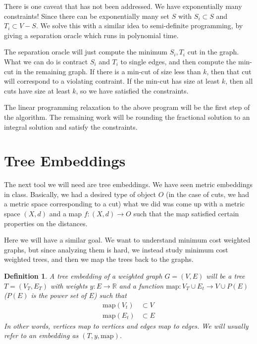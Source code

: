 \documentclass[12pt]{article}
\newtheorem{definition}{Definition}
\begin{document}
There is one caveat that has not been addressed. We have exponentially many constraints! Since there can be exponentially many set $S$ with $S_i \subset S$ and $T_i \subset V - S$. We solve this with a similar idea to semi-definite programming, by giving a separation oracle which runs in polynomial time. 

The separation oracle will just compute the minimum $S_i, T_i$ cut in the graph. What we can do is contract $S_i$ and $T_i$ to single edges, and then compute the min-cut in the remaining graph. If there is a min-cut of size less than $k$, then that cut will correspond to a violating contraint. If the min-cut has size at least $k$, then all cuts have size at least $k$, so we have satisfied the constraints.

The linear programming relaxation to the above program will be the first step of the algorithm. The remaining work will be rounding the fractional solution to an integral solution and satisfy the constraints. 

\section{Tree Embeddings}

The next tool we will need are tree embeddings. We have seen metric embeddings in class. Basically, we had a desired type of object $O$ (in the case of cuts, we had a metric space corresponding to a cut) what we did was come up with a metric space $(X, d)$ and a map $f: (X, d) \rightarrow O$ such that the map satisfied certain properties on the distances. 

Here we will have a similar goal. We want to understand minimum cost weighted graphs, but since analyzing them is hard, we instead study minimum cost weighted trees, and then we map the trees back to the graphs. 

\begin{definition}
A tree embedding of a weighted graph $G = (V, E)$ will be a tree $T = (V_T, E_T)$ with weights $y: E \rightarrow \mathbb{R}$ and a function $\text{map} : V_T \cup E_t \rightarrow V \cup P(E)$ ($P(E)$ is the power set of $E$) such that
\begin{align}
\text{map}(V_t) &\subset V \\
\text{map}(E_t) &\subset E
\end{align}
In other words, vertices map to vertices and edges map to edges. We will usually refer to an embedding as $(T, y, \text{map})$. 
\end{definition}
\end{document}
